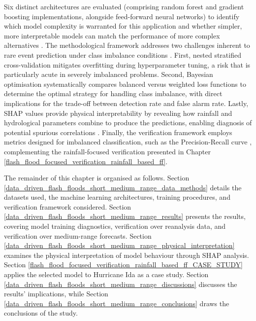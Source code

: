 Six  distinct architectures are evaluated (comprising random forest and gradient boosting implementations, alongside feed-forward neural networks) to identify which model complexity is warranted for this application and whether simpler, more interpretable models can match the performance of more complex alternatives \citep{Merz_2022}. The methodological framework addresses two challenges inherent to rare event prediction under class imbalance conditions \citep{Altalhan_2025}. First, nested stratified cross-validation mitigates overfitting during hyperparameter tuning, a risk that is particularly acute in severely imbalanced problems. Second, Bayesian optimisation systematically compares balanced versus weighted loss functions to determine the optimal strategy for handling class imbalance, with direct implications for the trade-off between detection rate and false alarm rate. Lastly, SHAP values provide physical interpretability by revealing how rainfall and hydrological parameters combine to produce the predictions, enabling diagnosis of potential spurious correlations \citep{Rozemberczki_2022}. Finally, the verification framework employs metrics designed for imbalanced classification, such as the Precision-Recall curve \citep{Sofaer_2019}, complementing the rainfall-focused verification presented in Chapter \ref{flash_flood_focused_verification_rainfall_based_ff}.

The  remainder of this chapter is organised as follows. Section \ref{data_driven_flash_floods_short_medium_range_data_methods} details the datasets used, the machine learning architectures, training procedures, and verification framework considered. Section \ref{data_driven_flash_floods_short_medium_range_results} presents the results, covering model training diagnostics, verification over reanalysis data, and verification over medium-range forecasts. Section \ref{data_driven_flash_floods_short_medium_range_physical_interpretation} examines the physical interpretation of model behaviour through SHAP analysis. Section \ref{flash_flood_focused_verification_rainfall_based_ff_CASE_STUDY} applies the selected model to Hurricane Ida as a case study. Section \ref{data_driven_flash_floods_short_medium_range_discussions} discusses the results' implications, while Section \ref{data_driven_flash_floods_short_medium_range_conclusions} draws the conclusions of the study.


